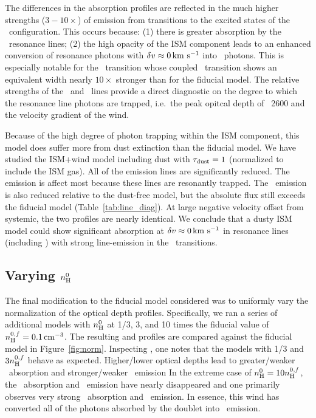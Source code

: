 \documentclass[12pt,preprint]{aastex}
\begin{document}
The differences in the  absorption profiles are reflected
in the much higher strengths ($3-10\times$) of emission from
transitions to the excited states of the \aconfig\ configuration.   This occurs because:
(1) there is greater absorption by the \feiid\
resonance lines; (2) the high opacity of the ISM component leads to
an enhanced conversion of resonance photons with $\delta v \approx 0\, {\rm km~s^{-1}}$
into \feiis\ photons.  This is especially notable for the
\feiib\ transition whose coupled \feiis\ transition shows an equivalent width nearly
$10\times$ stronger than for the fiducial model.  The relative
strengths of the \feiib\ and \feiie\ lines provide a direct
diagnostic on the degree to which the resonance line photons are
trapped, i.e.\ the peak opitcal depth of \ion{Fe}{2}~2600 and
the velocity gradient of the wind.

Because of the high degree of photon trapping within the ISM
component, this model does suffer more from dust extinction than the
fiducial model.  We have studied the ISM+wind model including dust
with $\tau_{\rm dust}=1$ (normalized to include the ISM gas).  All of the 
emission lines are significantly reduced.  The \ion{Mg}{2} emission is
affect most because these lines are resonantly trapped.  The \feiis\
emission is also reduced relative to the dust-free model, but the
absolute flux still exceeds the fiducial model
(Table~\ref{tab:line_diag}).  At large negative velocity offset from
systemic, the two profiles are nearly identical.
We conclude that a dusty ISM model could show significant absorption
at $\delta v \approx 0 \, {\rm km~s^{-1}}$ in resonance lines (including
\ion{Mg}{2}) with strong line-emission in the \feiis\
transitions.

\subsection{Varying $n_{\rm H}^0$}

The final modification to the fiducial model considered was to
uniformly vary the normalization of the optical depth profiles.
Specifically, we ran a series of additional models with $n_{\rm H}^0$ at
1/3, 3, and 10 times the fiducial value of $n_{\rm H}^{0,f} = 0.1 \, {\rm cm^{-3}}$.
The resulting \ion{Mg}{2} and \ion{Fe}{2} profiles are compared
against the fiducial model in Figure~\ref{fig:norm}.  Inspecting
\ion{Mg}{2}, one notes that the models with 1/3 and $3 n_{\rm H}^{0,f}$
behave as expected.  Higher/lower optical depths lead to
greater/weaker \mgiia\ absorption and stronger/weaker \mgiib\ emission
In the extreme case of
$n_{\rm H}^0 = 10 n_{\rm H}^{0,f}$, the \mgiib\ absorption and \mgiia\
emission have nearly disappeared and one primarily observes very
strong \mgiia\ absorption and \mgiib\ emission.
In essence, this wind has converted all of the photons absorbed by the
\ion{Mg}{2} doublet into \mgiib\ emission.
\end{document}
